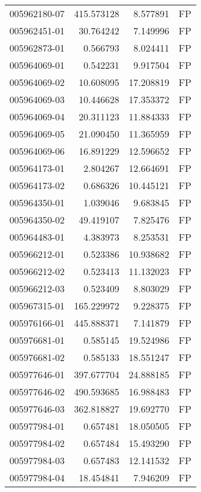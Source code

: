 \begin{tabular}{lrrl}
005962180-07 &  415.573128 &       8.577891 &   FP \\
005962451-01 &   30.764242 &       7.149996 &   FP \\
005962873-01 &    0.566793 &       8.024411 &   FP \\
005964069-01 &    0.542231 &       9.917504 &   FP \\
005964069-02 &   10.608095 &      17.208819 &   FP \\
005964069-03 &   10.446628 &      17.353372 &   FP \\
005964069-04 &   20.311123 &      11.884333 &   FP \\
005964069-05 &   21.090450 &      11.365959 &   FP \\
005964069-06 &   16.891229 &      12.596652 &   FP \\
005964173-01 &    2.804267 &      12.664691 &   FP \\
005964173-02 &    0.686326 &      10.445121 &   FP \\
005964350-01 &    1.039046 &       9.683845 &   FP \\
005964350-02 &   49.419107 &       7.825476 &   FP \\
005964483-01 &    4.383973 &       8.253531 &   FP \\
005966212-01 &    0.523386 &      10.938682 &   FP \\
005966212-02 &    0.523413 &      11.132023 &   FP \\
005966212-03 &    0.523409 &       8.803029 &   FP \\
005967315-01 &  165.229972 &       9.228375 &   FP \\
005976166-01 &  445.888371 &       7.141879 &   FP \\
005976681-01 &    0.585145 &      19.524986 &   FP \\
005976681-02 &    0.585133 &      18.551247 &   FP \\
005977646-01 &  397.677704 &      24.888185 &   FP \\
005977646-02 &  490.593685 &      16.988483 &   FP \\
005977646-03 &  362.818827 &      19.692770 &   FP \\
005977984-01 &    0.657481 &      18.050505 &   FP \\
005977984-02 &    0.657484 &      15.493290 &   FP \\
005977984-03 &    0.657483 &      12.141532 &   FP \\
005977984-04 &   18.454841 &       7.946209 &   FP \\

\end{tabular}

